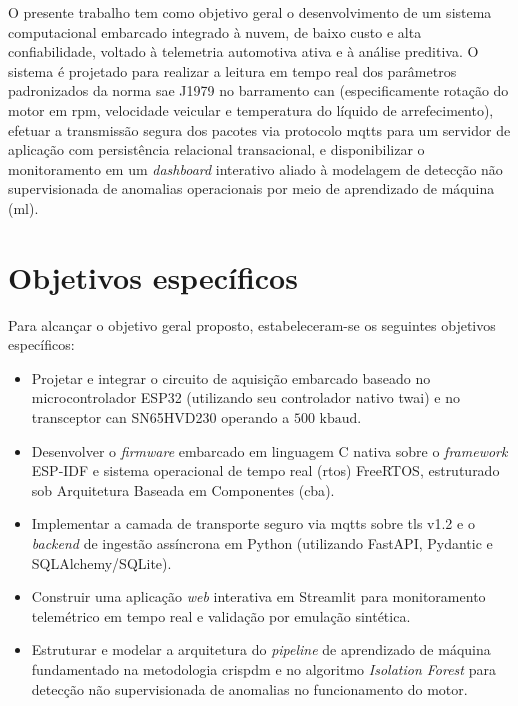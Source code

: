 \documentclass[
	12pt,				%
	openright,			%
	twoside,			%
	a4paper,			%
	english,			%
	brazil				%
	]{abntex2}
\begin{document}
O presente trabalho tem como objetivo geral o desenvolvimento de um sistema
computacional embarcado integrado à nuvem, de baixo custo e alta confiabilidade, voltado
à telemetria automotiva ativa e à análise preditiva. O sistema é projetado para realizar
a leitura em tempo real dos parâmetros padronizados da norma \acrshort{sae} J1979 no
barramento \acrshort{can} (especificamente rotação do motor em \acrshort{rpm},
velocidade veicular e temperatura do líquido de arrefecimento), efetuar a transmissão
segura dos pacotes via protocolo \acrshort{mqtts} para um servidor de aplicação com
persistência relacional transacional, e disponibilizar o monitoramento em um
\textit{dashboard} interativo aliado à modelagem de detecção não supervisionada de
anomalias operacionais por meio de aprendizado de máquina (\acrshort{ml}).

\section{Objetivos específicos}

Para alcançar o objetivo geral proposto, estabeleceram-se os seguintes objetivos
específicos:

\begin{itemize}
    \item Projetar e integrar o circuito de aquisição embarcado baseado no
        microcontrolador ESP32 (utilizando seu controlador nativo \acrshort{twai}) e no
        transceptor \acrshort{can} SN65HVD230 operando a $500\text{ kbaud}$.
    \item Desenvolver o \textit{firmware} embarcado em linguagem C nativa sobre o
        \textit{framework} ESP-IDF e sistema operacional de tempo real (\acrshort{rtos})
        FreeRTOS, estruturado sob Arquitetura Baseada em Componentes (\acrshort{cba}).
    \item Implementar a camada de transporte seguro via \acrshort{mqtts} sobre
        \acrshort{tls} v1.2 e o \textit{backend} de ingestão assíncrona em Python
        (utilizando FastAPI, Pydantic e SQLAlchemy/SQLite).
    \item Construir uma aplicação \textit{web} interativa em Streamlit para
        monitoramento telemétrico em tempo real e validação por emulação sintética.
    \item Estruturar e modelar a arquitetura do \textit{pipeline} de aprendizado de
        máquina fundamentado na metodologia \acrshort{crispdm} e no algoritmo
        \textit{Isolation Forest} para detecção não supervisionada de anomalias no
        funcionamento do motor.
\end{itemize}
\end{document}
